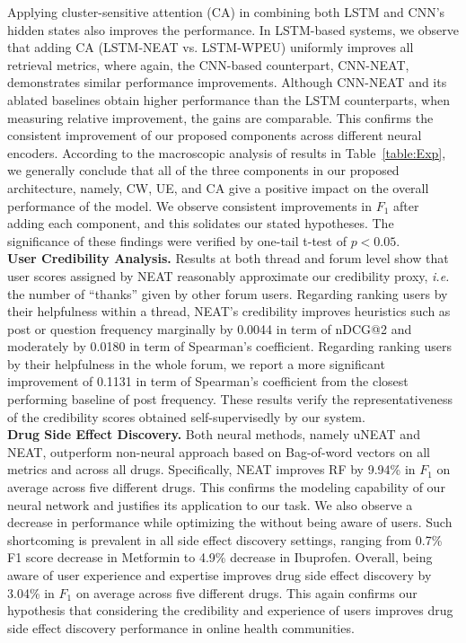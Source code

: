 \documentclass{bmcart}
\begin{document}
Applying cluster-sensitive attention (CA) in combining both LSTM and CNN's
hidden states also improves the performance. In LSTM-based systems, we observe 
that adding CA (LSTM-NEAT vs. LSTM-WPEU) uniformly improves all retrieval metrics, where again, the CNN-based counterpart,
CNN-NEAT, demonstrates similar performance improvements. Although CNN-NEAT and its ablated baselines obtain higher performance than the LSTM counterparts, when measuring relative improvement, the gains are comparable. This confirms the consistent improvement of our proposed components across different neural encoders. According to the macroscopic analysis of results in
Table~\ref{table:Exp}, we generally conclude that all of the three components in our proposed architecture, namely, CW, UE, and
CA give a positive impact on the overall performance of the
model. We observe consistent improvements in $F_1$ after adding each component, and this solidates our stated hypotheses. The significance of these findings were verified by one-tail t-test of $p < 0.05$. \\

{\bf User Credibility Analysis.}
Results at both thread and forum level show that user scores assigned by NEAT reasonably approximate our credibility proxy, \textit{i.e.} the number of ``thanks'' given by other forum users. Regarding ranking users by their helpfulness within a thread, NEAT's credibility improves heuristics such as post or question frequency marginally by 0.0044 in term of nDCG@2 and moderately by 0.0180 in term of Spearman's coefficient. Regarding ranking users by their helpfulness in the whole forum, we report a more significant improvement of 0.1131 in term of Spearman's coefficient from the closest performing baseline of post frequency. These results verify the representativeness of the credibility scores obtained self-supervisedly by our system. \\

{\bf Drug Side Effect Discovery.}
Both neural methods, namely uNEAT and NEAT, outperform non-neural approach based on Bag-of-word vectors on all metrics and across all drugs. Specifically, NEAT improves RF by 9.94\% in $F_1$ on average across five different drugs. This confirms the modeling capability of our neural network and justifies its application to our task. We also observe a decrease in performance while optimizing the without being aware of users. Such shortcoming is prevalent in all side effect discovery settings, ranging from 0.7\% F1 score decrease in Metformin to 4.9\% decrease in Ibuprofen. Overall, being aware of user experience and expertise improves drug side effect discovery by 3.04\% in $F_1$ on average across five different drugs. This again confirms our hypothesis that considering the credibility and experience of users improves drug side effect discovery performance in online health communities. \\
\end{document}
